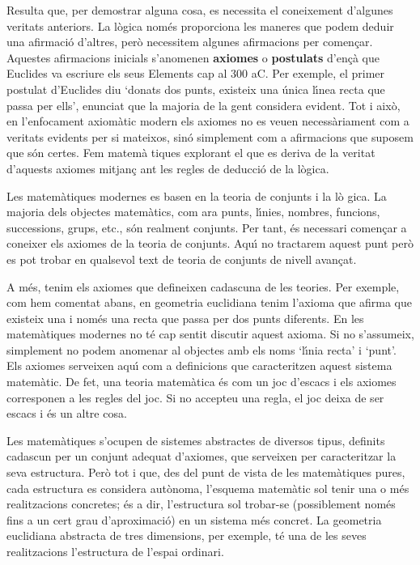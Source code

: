 Resulta que, per demostrar alguna cosa, es necessita el coneixement
d'algunes veritats anteriors. La l\`{o}gica nom\'{e}s proporciona les
maneres que podem deduir una afirmaci\'{o} d'altres, per\`{o} necessitem
algunes afirmacions per comen\c{c}ar. Aquestes afirmacions inicials
s'anomenen \textbf{axiomes} o \textbf{postulats} d'en\c{c}\`{a} que Euclides
va escriure els seus Elements cap al 300 aC. Per exemple, el primer postulat
d'Euclides diu `donats dos punts, existeix una \'{u}nica l\'{\i}nea recta
que passa per ells', enunciat que la majoria de la gent considera evident.
Tot i aix\`{o}, en l'enfocament axiom\`{a}tic modern els axiomes no es veuen
necess\`{a}riament com a veritats evidents per si mateixos, sin\'{o}
simplement com a afirmacions que suposem que s\'{o}n certes. Fem matem\`{a}%
tiques explorant el que es deriva de la veritat d'aquests axiomes mitjan\c{c}%
ant les regles de deducci\'{o} de la l\`{o}gica.

\bigskip

Les matem\`{a}tiques modernes es basen en la teoria de conjunts i la l\`{o}%
gica. La majoria dels objectes matem\`{a}tics, com ara punts, l\'{\i}nies,
nombres, funcions, successions, grups, etc., s\'{o}n realment conjunts. Per
tant, \'{e}s necessari comen\c{c}ar a coneixer els axiomes de la teoria de
conjunts. Aqu\'{\i} no tractarem aquest punt per\`{o} es pot trobar en
qualsevol text de teoria de conjunts de nivell avan\c{c}at.

A m\'{e}s, tenim els axiomes que defineixen cadascuna de les teories. Per
exemple, com hem comentat abans, en geometria euclidiana tenim l'axioma que
afirma que existeix una i nom\'{e}s una recta que passa per dos punts
diferents. En les matem\`{a}tiques modernes no t\'{e} cap sentit discutir
aquest axioma. Si no s'assumeix, simplement no podem anomenar al objectes
amb els noms `l\'{\i}nia recta' i `punt'. Els axiomes serveixen aqu\'{\i}
com a definicions que caracteritzen aquest sistema matem\`{a}tic. De fet,
una teoria matem\`{a}tica \'{e}s com un joc d'escacs i els axiomes
corresponen a les regles del joc. Si no accepteu una regla, el joc deixa de
ser escacs i \'{e}s un altre cosa.

\bigskip

Les matem\`{a}tiques s'ocupen de sistemes abstractes de diversos tipus,
definits cadascun per un conjunt adequat d'axiomes, que serveixen per
caracteritzar la seva estructura. Per\`{o} tot i que, des del punt de vista
de les matem\`{a}tiques pures, cada estructura es considera aut\`{o}noma,
l'esquema matem\`{a}tic sol tenir una o m\'{e}s realitzacions concretes;
\'{e}s a dir, l'estructura sol trobar-se (possiblement nom\'{e}s fins a un
cert grau d'aproximaci\'{o}) en un sistema m\'{e}s concret. La geometria
euclidiana abstracta de tres dimensions, per exemple, t\'{e} una de les
seves realitzacions l'estructura de l'espai ordinari.

